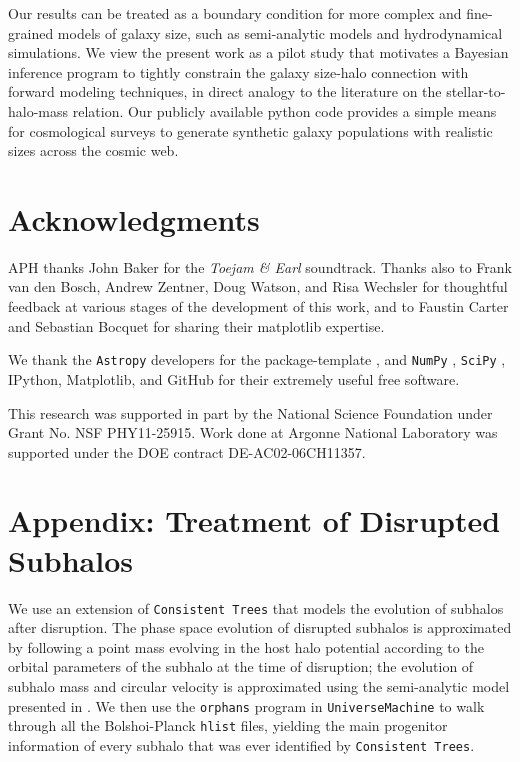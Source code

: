 \documentclass[usenatbib,usegraphicx,letterpaper]{mn2e}
\begin{document}
Our results can be treated as a boundary condition for more complex and fine-grained models of galaxy size, such as semi-analytic models and hydrodynamical simulations. We view the present work as a pilot study that motivates a Bayesian inference program to tightly constrain the galaxy size-halo connection with forward modeling techniques, in direct analogy to the literature on the stellar-to-halo-mass relation. Our publicly available python code provides a simple means for cosmological surveys to generate synthetic galaxy populations with realistic sizes across the cosmic web.

\section*{Acknowledgments}

APH thanks John Baker for the {\em Toejam \& Earl} soundtrack. Thanks also to Frank van den Bosch, Andrew Zentner, Doug Watson, and Risa Wechsler for thoughtful feedback at various stages of the development of this work, and to Faustin Carter and Sebastian Bocquet for sharing their matplotlib expertise.

We thank the {\tt Astropy} developers for the package-template \citep{astropy}, and {\tt NumPy} \citep{numpy_ndarray}, {\tt SciPy} \citep{scipy}, IPython, Matplotlib, and GitHub for their extremely useful free software.

This research was supported in part by the National Science Foundation under Grant No. NSF PHY11-25915. Work done at Argonne National Laboratory was supported under the DOE contract DE-AC02-06CH11357.



\section*{Appendix: Treatment of Disrupted Subhalos}

We use an extension of {\tt Consistent Trees} that models the evolution of subhalos after disruption. The phase space evolution of disrupted subhalos is approximated by following a point mass evolving in the host halo potential according to the orbital parameters of the subhalo at the time of disruption; the evolution of subhalo mass and circular velocity is approximated using the semi-analytic model presented in \citet{jiang_vdB14}. We then use the {\tt orphans} program in {\tt UniverseMachine} to walk through all the Bolshoi-Planck {\tt hlist} files, yielding the main progenitor information of every subhalo that was ever identified by {\tt Consistent Trees}.
\end{document}
